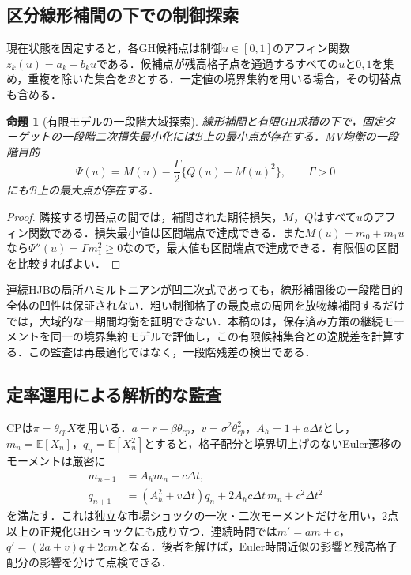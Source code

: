 \documentclass[10pt,a4paper]{article}
\numberwithin{equation}{section}
\numberwithin{table}{section}
\numberwithin{figure}{section}
\theoremstyle{plain}
\newtheorem{proposition}{命題}
\theoremstyle{definition}
\newcommand{\E}{\mathbb{E}}
\begin{document}
\subsection{区分線形補間の下での制御探索}
現在状態を固定すると，各GH候補点は制御$u\in[0,1]$のアフィン関数$z_k(u)=a_k+b_ku$である．候補点が残高格子点を通過するすべての$u$と$0,1$を集め，重複を除いた集合を$\mathcal B$とする．一定値の境界集約を用いる場合，その切替点も含める．
\begin{proposition}[有限モデルの一段階大域探索]
\label{prop:breakpoints}
線形補間と有限GH求積の下で，固定ターゲットの一段階二次損失最小化には$\mathcal B$上の最小点が存在する．MV均衡の一段階目的
\begin{equation}
\Psi(u)=M(u)-\frac\Gamma2\{Q(u)-M(u)^2\},\qquad\Gamma>0
\label{eq:psidiscrete}
\end{equation}
にも$\mathcal B$上の最大点が存在する．
\end{proposition}
\begin{proof}
隣接する切替点の間では，補間された期待損失，$M$，$Q$はすべて$u$のアフィン関数である．損失最小値は区間端点で達成できる．また$M(u)=m_0+m_1u$なら$\Psi''(u)=\Gamma m_1^2\geq0$なので，最大値も区間端点で達成できる．有限個の区間を比較すればよい．
\end{proof}
連続HJBの局所ハミルトニアンが凹二次式であっても，線形補間後の一段階目的全体の凹性は保証されない．粗い制御格子の最良点の周囲を放物線補間するだけでは，大域的な一期間均衡を証明できない．本稿のは，保存済み方策の継続モーメントを同一の境界集約モデルで評価し，この有限候補集合との逸脱差を計算する．この監査は再最適化ではなく，一段階残差の検出である．

\subsection{定率運用による解析的な監査}
\label{sec:cp}
CPは$\pi=\theta_{cp}X$を用いる．$a=r+\beta\theta_{cp}$，$v=\sigma^2\theta_{cp}^2$，$A_h=1+a\Delta t$とし，$m_n=\E[X_n]$，$q_n=\E[X_n^2]$とすると，格子配分と境界切上げのないEuler遷移のモーメントは厳密に
\begin{align}
m_{n+1}&=A_hm_n+c\Delta t,\label{eq:cpm}\\
q_{n+1}&=(A_h^2+v\Delta t)q_n+2A_hc\Delta t\,m_n+c^2\Delta t^2
\label{eq:cpq}
\end{align}
を満たす．これは独立な市場ショックの一次・二次モーメントだけを用い，2点以上の正規化GHショックにも成り立つ．連続時間では$m'=am+c$，$q'=(2a+v)q+2cm$となる．後者を解けば，Euler時間近似の影響と残高格子配分の影響を分けて点検できる．
\end{document}
